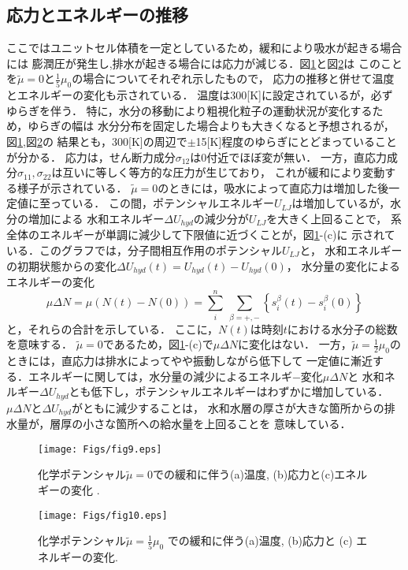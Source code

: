 \subsection{応力とエネルギーの推移}
ここではユニットセル体積を一定としているため，緩和により吸水が起きる場合には
膨潤圧が発生し,排水が起きる場合には応力が減じる．図\ref{fig:fig9}と図\ref{fig:fig10}は
このことを$\tilde \mu=0$と$\frac{1}{5}\mu_0$の場合についてそれぞれ示したもので，
応力の推移と併せて温度とエネルギーの変化も示されている．
温度は300[K]に設定されているが，必ずゆらぎを伴う．
特に，水分の移動により粗視化粒子の運動状況が変化するため，ゆらぎの幅は
水分分布を固定した場合よりも大きくなると予想されるが，図\ref{fig:fig9},図\ref{fig:fig10}の
結果とも，300[K]の周辺で$\pm$15[K]程度のゆらぎにとどまっていることが分かる．
応力は，せん断力成分$\sigma_{12}$は0付近でほぼ変が無い．
一方，直応力成分$\sigma_{11},\sigma_{22}$は互いに等しく等方的な圧力が生じており，
これが緩和により変動する様子が示されている．
$\tilde \mu=0$のときには，吸水によって直応力は増加した後一定値に至っている．
この間，ポテンシャルエネルギー$U_{LJ}$は増加しているが，水分の増加による
水和エネルギー$\Delta U_{hyd}$の減少分が$U_{LJ}$を大きく上回ることで，
系全体のエネルギーが単調に減少して下限値に近づくことが，図\ref{fig:fig9}-(c)に
示されている．このグラフでは，分子間相互作用のポテンシャル$U_{LJ}$と，
水和エネルギーの初期状態からの変化$\Delta U_{hyd}(t)=U_{hyd}(t)-U_{hyd}(0)$，
水分量の変化によるエネルギーの変化
\begin{equation}
	\mu \Delta N= \mu \left(N(t)-N(0) \right) 
	= \sum_i^n\ \sum_{\beta=+,-}\left\{ s_i^\beta(t)-s_i^\beta(0) \right\}
	\label{eqn:mu_dN}
\end{equation}
と，それらの合計を示している．
ここに，$N(t)$は時刻$t$における水分子の総数を意味する．
$\tilde \mu=0$であるため，図\ref{fig:fig9}-(c)で$\mu \Delta N$に変化はない．
%
一方，$\tilde \mu =\frac{1}{2}\mu_0$のときには，直応力は排水によってやや振動しながら低下して
一定値に漸近する．エネルギーに関しては，水分量の減少によるエネルギ−変化$\mu \Delta N$と
水和ネルギー$\Delta U_{hyd}$とも低下し，ポテンシャルエネルギーはわずかに増加している．
$\mu \Delta N$と$\Delta U_{hyd}$がともに減少することは，
水和水層の厚さが大きな箇所からの排水量が，層厚の小さな箇所への給水量を上回ることを
意味している．
\begin{figure}[h]
	\begin{center}
	\texttt{[image: Figs/fig9.eps]} 
	\end{center}
	\caption{
		化学ポテンシャル$\tilde \mu=0$での緩和に伴う(a)温度, (b)応力と(c)エネルギーの変化 .
	} 
	\label{fig:fig9}
\end{figure}
\begin{figure}[h]
	\begin{center}
	\texttt{[image: Figs/fig10.eps]} 
	\end{center}
	\caption{
		化学ポテンシャル$\tilde \mu =\frac{1}{5}\mu_0$
		での緩和に伴う(a)温度, (b)応力と (c) エネルギーの変化.
	} 
	\label{fig:fig10}
\end{figure}
